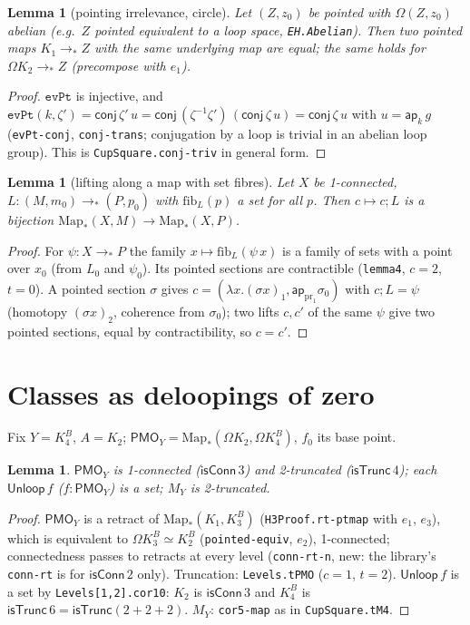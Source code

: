 \documentclass[11pt]{amsart}
\newtheorem{lemma}[theorem]{Lemma}
\theoremstyle{definition}
\theoremstyle{remark}
\newcommand{\Om}{\Omega}
\newcommand{\Map}{\mathrm{Map}_*}
\newcommand{\code}[1]{\texttt{#1}}
\newcommand{\cT}{\mathsf{isTrunc}}
\newcommand{\cC}{\mathsf{isConn}}
\newcommand{\Unl}{\mathsf{Unloop}}
\newcommand{\PMO}{\mathsf{PMO}}
\begin{document}
\begin{lemma}[pointing irrelevance, circle]\label{l:pi-circle}
Let $(Z,z_0)$ be pointed with $\Om(Z,z_0)$ abelian (e.g.\ $Z$ pointed
equivalent to a loop space, \code{EH.Abelian}). Then two pointed maps
$K_1\to_*Z$ with the same underlying map are equal; the same holds for
$\Om K_2\to_*Z$ (precompose with $e_1$).
\end{lemma}
\begin{proof}
$\code{evPt}$ is injective, and $\code{evPt}(k,\zeta')=\mathsf{conj}\,\zeta'\,u
=\mathsf{conj}\,(\zeta^{-1}\zeta')\,(\mathsf{conj}\,\zeta\,u)=\mathsf{conj}\,\zeta\,u$
with $u=\mathsf{ap}_k\,g$ (\code{evPt-conj}, \code{conj-trans}; conjugation by a
loop is trivial in an abelian loop group). This is \code{CupSquare.conj-triv}
in general form.
\end{proof}

\begin{lemma}[lifting along a map with set fibres]\label{l:lift}
Let $X$ be 1-connected, $L:(M,m_0)\to_*(P,p_0)$ with
$\mathrm{fib}_L(p)$ a set for all $p$. Then $c\mapsto c;L$ is a bijection
$\Map(X,M)\to\Map(X,P)$.
\end{lemma}
\begin{proof}
For $\psi:X\to_*P$ the family $x\mapsto\mathrm{fib}_L(\psi\,x)$ is a family
of sets with a point over $x_0$ (from $L_0$ and $\psi_0$). Its pointed
sections are contractible (\code{lemma4}, $c=2$, $t=0$). A pointed
section $\sigma$ gives $c=(\lambda x.(\sigma x)_1,\mathsf{ap}_{\mathrm{pr}_1}\sigma_0)$
with $c;L=\psi$ (homotopy $(\sigma x)_2$, coherence from $\sigma_0$); two
lifts $c,c'$ of the same $\psi$ give two pointed sections, equal by
contractibility, so $c=c'$.
\end{proof}

\section{Classes as deloopings of zero}\label{sec:P}

Fix $Y=K^B_4$, $A=K_2$; $\PMO_Y=\Map(\Om K_2,\Om K^B_4)$, $f_0$ its base point.

\begin{lemma}\label{l:pmo}
$\PMO_Y$ is 1-connected ($\cC\,3$) and 2-truncated ($\cT\,4$); each
$\Unl\,f$ ($f:\PMO_Y$) is a set; $M_Y$ is 2-truncated.
\end{lemma}
\begin{proof}
$\PMO_Y$ is a retract of $\Map(K_1,K^B_3)$ (\code{H3Proof.rt-ptmap} with
$e_1$, $e_3$), which is equivalent to $\Om K^B_3\simeq K^B_2$
(\code{pointed-equiv}, $e_2$), 1-connected; connectedness passes to
retracts at every level (\code{conn-rt-n}, new: the library's
\code{conn-rt} is for $\cC\,2$ only). Truncation: \code{Levels.tPMO} ($c=1$, $t=2$). $\Unl\,f$ is a set
by \code{Levels[1,2].cor10}: $K_2$ is $\cC\,3$ and $K^B_4$ is
$\cT\,6=\cT(2+2+2)$. $M_Y$: \code{cor5-map} as in \code{CupSquare.tM4}.
\end{proof}
\end{document}

